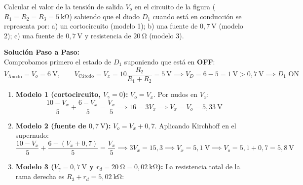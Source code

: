\begin{ejercicio}
Calcular el valor de la tensión de salida $V_o$ en el circuito de la figura ($R_1 = R_2 = R_3 = 5\ \si{\kilo\ohm}$) sabiendo que el diodo $D_1$ cuando está en conducción se representa por:
a) un cortocircuito (modelo 1); \quad b) una fuente de $0{,}7\ \si{\volt}$ (modelo 2); \quad c) una fuente de $0{,}7\ \si{\volt}$ y resistencia de $20\ \si{\ohm}$ (modelo 3).
\tcbline
\begin{center}
\end{center}
\textbf{Solución Paso a Paso:}\\[4pt]
Comprobamos primero el estado de $D_1$ suponiendo que está en \textbf{OFF}:
\begin{equation}
    V_{\text{Ánodo}} = V_o = 6\ \si{\volt}, \qquad V_{\text{Cátodo}} = V_x = 10 \frac{R_2}{R_1 + R_2} = 5\ \si{\volt} \implies V_D = 6 - 5 = 1\ \si{\volt} > 0{,}7\ \si{\volt} \implies D_1\text{ ON}
\end{equation}
\begin{enumerate}[label=\alph*)]
    \item \textbf{Modelo 1 (cortocircuito, $V_\gamma = 0$):} $V_o = V_x$. Por nudos en $V_x$:
    \begin{equation}
        \frac{10 - V_x}{5} + \frac{6 - V_x}{5} = \frac{V_x}{5} \implies 16 = 3 V_x \implies V_x = V_o = 5{,}33\ \si{\volt}
    \end{equation}
    \item \textbf{Modelo 2 (fuente de $0{,}7\ \si{\volt}$):} $V_o = V_x + 0{,}7$. Aplicando Kirchhoff en el supernudo:
    \begin{equation}
        \frac{10 - V_x}{5} + \frac{6 - (V_x + 0{,}7)}{5} = \frac{V_x}{5} \implies 3 V_x = 15{,}3 \implies V_x = 5{,}1\ \si{\volt} \implies V_o = 5{,}1 + 0{,}7 = 5{,}8\ \si{\volt}
    \end{equation}
    \item \textbf{Modelo 3 ($V_\gamma = 0{,}7\ \si{\volt}$ y $r_d = 20\ \si{\ohm} = 0{,}02\ \si{\kilo\ohm}$):} La resistencia total de la rama derecha es $R_3 + r_d = 5{,}02\ \si{\kilo\ohm}$:

\end{enumerate}
\end{ejercicio}
